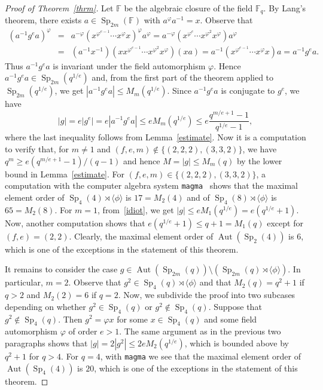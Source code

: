 \documentclass{amsart}
\begin{document}
\begin{proof}[Proof of Theorem~\ref{thrm}]
Let $\mathbb{F}$ be the algebraic closure of the field $\mathbb{F}_{q}$. By Lang's theorem, there exists $a\in {\mathop{\mathrm{Sp}}}_{2m}(\mathbb{F})$ with $a^{\varphi}a^{-1}=x$. Observe that
\begin{eqnarray*}
(a^{-1}g^ea)^\varphi&=&a^{-\varphi}(x^{\varphi^{e-1}}\cdots x^{\varphi} x)^\varphi a^{\varphi}=a^{-\varphi}(x^{\varphi^{e}}\cdots x^{\varphi^2} x^\varphi)a^{\varphi}\\
&=&(a^{-1}x^{-1})(xx^{\varphi^{e-1}}\cdots x^{\varphi^2} x^\varphi)(xa)
=a^{-1}(x^{\varphi^{e-1}}\cdots x^\varphi x)a=a^{-1}g^ea.
\end{eqnarray*}
Thus $a^{-1}g^ea$ is invariant under the field automorphism $\varphi$. Hence $a^{-1}g^ea\in {\mathop{\mathrm{Sp}}}_{2m}(q^{1/e})$ and, from the first part of the theorem applied to ${\mathop{\mathrm{Sp}}}_{2m}(q^{1/e})$, we get $|a^{-1}g^ea|\leq M_m(q^{1/e})$. Since $a^{-1}g^ea$ is conjugate to $g^e$, we have
\begin{equation}\label{idiot}
|g|=e|g^e|=e|a^{-1}g^ea|\leq eM_m(q^{1/e})\leq e\frac{q^{m/e+1}-1}{q^{1/e}-1},
\end{equation}
where the last inequality follows from Lemma~\ref{estimate}. Now it is a computation to verify that, for $m\neq 1$ and $(f,e,m)\notin\{(2,2,2),(3,3,2)\}$, we have $q^m\geq e(q^{m/e+1}-1)/(q-1)$ and hence $M=|g|\leq M_{m}(q)$ by the lower bound in  Lemma~\ref{estimate}. For $(f,e,m)\in \{(2,2,2),(3,3,2)\}$, a computation with the computer algebra system \texttt{magma}~\cite{magma} shows that the maximal element order of ${\mathop{\mathrm{Sp}}}_4(4)\rtimes \langle \phi\rangle$ is $17=M_2(4)$ and of ${\mathop{\mathrm{Sp}}}_4(8)\rtimes\langle \phi\rangle$ is $65=M_2(8)$. For $m=1$, from~\eqref{idiot}, we get $|g|\leq eM_1(q^{1/e})=e(q^{1/e}+1)$. Now, another computation shows that $e(q^{1/e}+1)\leq q+1=M_1(q)$ except for $(f,e)=(2,2)$. Clearly, the maximal element order of ${\mathop{\mathrm{Aut}}}({\mathop{\mathrm{Sp}}}_2(4))$ is $6$, which is one of the exceptions in the statement of this theorem. 

It remains to consider the case $g\in {\mathop{\mathrm{Aut}}}({\mathop{\mathrm{Sp}}}_{2m}(q))\setminus ({\mathop{\mathrm{Sp}}}_{2m}(q)\rtimes \langle\phi\rangle)$. In particular, $m=2$. Observe that $g^2\in {\mathop{\mathrm{Sp}}}_4(q)\rtimes \langle \phi\rangle$ and that $M_2(q)=q^2+1$ if $q>2$ and $M_2(2)=6$ if $q=2$. Now, we subdivide the proof into two subcases depending on whether $g^2\in {\mathop{\mathrm{Sp}}}_4(q)$ or $g^2\notin {\mathop{\mathrm{Sp}}}_4(q)$. Suppose that $g^2\notin {\mathop{\mathrm{Sp}}}_4(q)$. Then $g^2=\varphi x$ for some $x\in {\mathop{\mathrm{Sp}}}_4(q)$ and some field automorphism $\varphi$ of order $e> 1$. The same argument as in the previous two paragraphs shows that $|g|=2|g^2|\leq 2eM_2(q^{1/e})$, which is bounded above by $q^2+1$ for $q>4$. For $q=4$, with \texttt{magma} we see that the maximal element order of ${\mathop{\mathrm{Aut}}}({\mathop{\mathrm{Sp}}}_4(4))$ is $20$, which is one of the exceptions in the statement of this theorem.


\end{proof}
\end{document}
